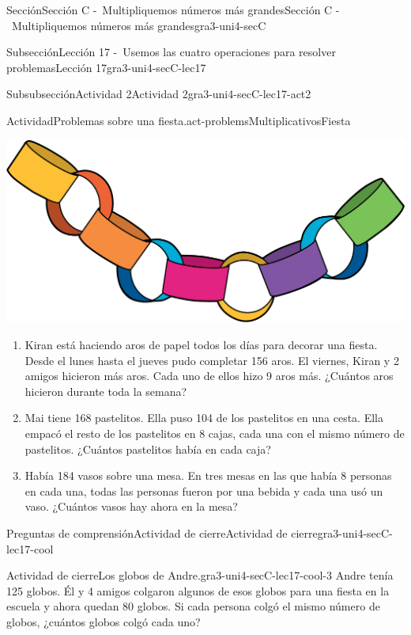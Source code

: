 \documentclass[twoside,10pt,]{article}
\begin{document}
\begin{sectionptx}{Sección}{Sección C -~Multipliquemos números más grandes}{}{Sección C -~Multipliquemos números más grandes}{}{}{gra3-uni4-secC}
\begin{subsectionptx}{Subsección}{Lección 17 -~Usemos las cuatro operaciones para resolver problemas}{}{Lección 17}{}{}{gra3-uni4-secC-lec17}
\begin{subsubsectionptx}{Subsubsección}{Actividad 2}{}{Actividad 2}{}{}{gra3-uni4-secC-lec17-act2}
\begin{activity}{Actividad}{Problemas sobre una fiesta.}{act-problemsMultiplicativosFiesta}
\begin{sidebyside}{2}{0.05}{0.05}{0}
\begin{sbspanel}{0.3}
\includegraphics[width=\linewidth]{external/png-source/CS 3.4 Lesson 17.png}
\end{sbspanel}%
\end{sidebyside}%
%
\begin{enumerate}
\item{}Kiran está haciendo aros de papel todos los días para decorar una fiesta. Desde el lunes hasta el jueves pudo completar 156 aros. El viernes, Kiran y 2 amigos hicieron más aros. Cada uno de ellos hizo 9 aros más. ¿Cuántos aros hicieron durante toda la semana?%
\item{}Mai tiene 168 pastelitos. Ella puso 104 de los pastelitos en una cesta. Ella empacó el resto de los pastelitos en 8 cajas, cada una con el mismo número de pastelitos. ¿Cuántos pastelitos había en cada caja?%
\item{}Había 184 vasos sobre una mesa. En tres mesas en las que había 8 personas en cada una, todas las personas fueron por una bebida y cada una usó un vaso. ¿Cuántos vasos hay ahora en la mesa?%
\end{enumerate}
\end{activity}%
\end{subsubsectionptx}
%
%
\typeout{************************************************}
\typeout{************************************************}
%
\begin{reading-questions-subsubsection}{Preguntas de comprensión}{Actividad de cierre}{}{Actividad de cierre}{}{}{gra3-uni4-secC-lec17-cool}
\begin{project}{Actividad de cierre}{Los globos de Andre.}{gra3-uni4-secC-lec17-cool-3}%
Andre tenía 125 globos. Él y 4 amigos colgaron algunos de esos globos para una fiesta en la escuela y ahora quedan 80 globos. Si cada persona colgó el mismo número de globos, ¿cuántos globos colgó cada uno?%
%
\begin{enumerate}[label=(\alph*)]

\end{enumerate}
\end{project}
\end{reading-questions-subsubsection}
\end{subsectionptx}
\end{sectionptx}
\end{document}
